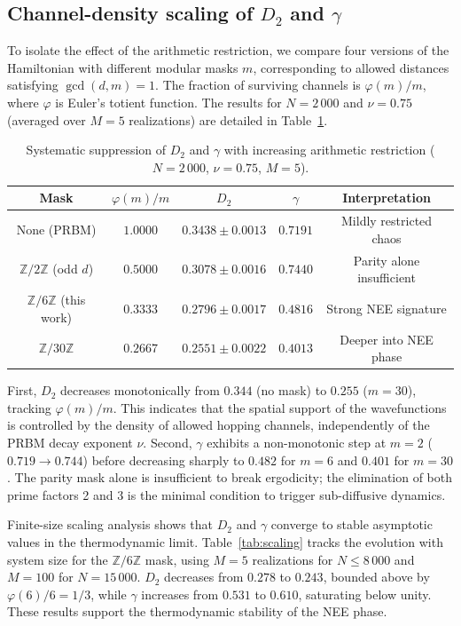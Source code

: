 \documentclass[11pt,a4paper]{article}
\begin{document}
\subsection{Channel-density scaling of \texorpdfstring{$D_2$}{D2} and \texorpdfstring{$\gamma$}{gamma}}
\label{sec:channel_density_scaling}

To isolate the effect of the arithmetic restriction, we compare four versions of the Hamiltonian with different modular masks $m$, corresponding to allowed distances satisfying $\gcd(d,m)=1$. The fraction of surviving channels is $\varphi(m)/m$, where $\varphi$ is Euler's totient function. The results for $N=2\,000$ and $\nu=0.75$ (averaged over $M=5$ realizations) are detailed in Table~\ref{tab:mask_comparison}.

\begin{table}[htbp]
\centering
\caption{Systematic suppression of $D_2$ and $\gamma$ with increasing arithmetic restriction ($N=2\,000$, $\nu=0.75$, $M=5$).}
\label{tab:mask_comparison}
\begin{tabular}{c c c c c}
\toprule
\textbf{Mask} & $\varphi(m)/m$ & $D_2$ & $\gamma$ & \textbf{Interpretation} \\
\midrule
None (PRBM)     & $1.0000$ & $0.3438 \pm 0.0013$ & $0.7191$ & Mildly restricted chaos \\
$\mathbb{Z}/2\mathbb{Z}$ (odd $d$) & $0.5000$ & $0.3078 \pm 0.0016$ & $0.7440$ & Parity alone insufficient \\
$\mathbb{Z}/6\mathbb{Z}$ (this work) & $0.3333$ & $0.2796 \pm 0.0017$ & $0.4816$ & Strong NEE signature \\
$\mathbb{Z}/30\mathbb{Z}$ & $0.2667$ & $0.2551 \pm 0.0022$ & $0.4013$ & Deeper into NEE phase \\
\bottomrule
\end{tabular}
\end{table}

First, $D_2$ decreases monotonically from $0.344$ (no mask) to $0.255$ ($m=30$), tracking $\varphi(m)/m$. This indicates that the spatial support of the wavefunctions is controlled by the density of allowed hopping channels, independently of the PRBM decay exponent $\nu$. Second, $\gamma$ exhibits a non-monotonic step at $m=2$ ($0.719 \to 0.744$) before decreasing sharply to $0.482$ for $m=6$ and $0.401$ for $m=30$. The parity mask alone is insufficient to break ergodicity; the elimination of both prime factors 2 and 3 is the minimal condition to trigger sub-diffusive dynamics. 

Finite-size scaling analysis shows that $D_2$ and $\gamma$ converge to stable asymptotic values in the thermodynamic limit. Table~\ref{tab:scaling} tracks the evolution with system size for the $\mathbb{Z}/6\mathbb{Z}$ mask, using $M=5$ realizations for $N \le 8\,000$ and $M=100$ for $N=15\,000$. $D_2$ decreases from $0.278$ to $0.243$, bounded above by $\varphi(6)/6 = 1/3$, while $\gamma$ increases from $0.531$ to $0.610$, saturating below unity. These results support the thermodynamic stability of the NEE phase.
\end{document}
